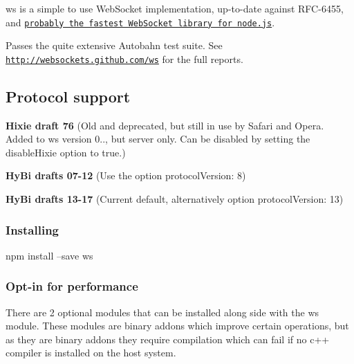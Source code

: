 \href{https://travis-ci.org/websockets/ws}{\tt }

{\ttfamily ws} is a simple to use Web\+Socket implementation, up-\/to-\/date against R\+F\+C-\/6455, and \href{http://web.archive.org/web/20130314230536/http://hobbycoding.posterous.com/the-fastest-websocket-module-for-nodejs}{\tt probably the fastest Web\+Socket library for node.\+js}.

Passes the quite extensive Autobahn test suite. See \href{http://websockets.github.com/ws}{\tt http\+://websockets.\+github.\+com/ws} for the full reports.

\subsection*{Protocol support}


\begin{DoxyItemize}
\item {\bfseries Hixie draft 76} (Old and deprecated, but still in use by Safari and Opera. Added to ws version 0.., but server only. Can be disabled by setting the {\ttfamily disable\+Hixie} option to true.)
\item {\bfseries Hy\+Bi drafts 07-\/12} (Use the option {\ttfamily protocol\+Version\+: 8})
\item {\bfseries Hy\+Bi drafts 13-\/17} (Current default, alternatively option {\ttfamily protocol\+Version\+: 13})
\end{DoxyItemize}

\subsubsection*{Installing}


\begin{DoxyCode}
npm install --save ws
\end{DoxyCode}


\subsubsection*{Opt-\/in for performance}

There are 2 optional modules that can be installed along side with the {\ttfamily ws} module. These modules are binary addons which improve certain operations, but as they are binary addons they require compilation which can fail if no c++ compiler is installed on the host system.


